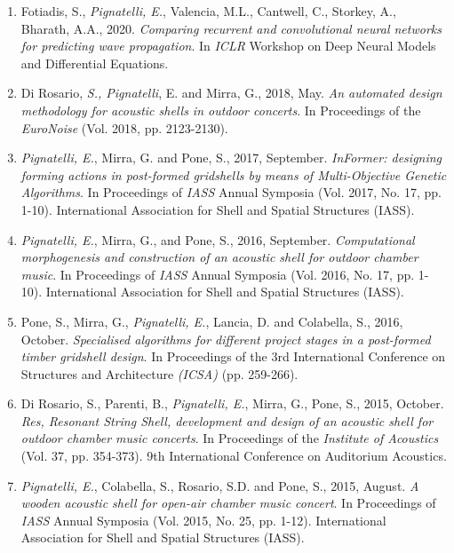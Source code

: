 \begin{publications}
\begin{enumerate}[leftmargin=0.45cm, itemsep=0em, topsep=0.5em, parsep=0.2em]
        \item Fotiadis, S., \emph{Pignatelli, E.}, Valencia, M.L., Cantwell, C., Storkey, A., Bharath, A.A., 2020. \textit{Comparing recurrent and convolutional neural networks for predicting wave propagation}. In \emph{ICLR} Workshop on Deep Neural Models and Differential Equations.
        \item Di Rosario, \emph{S., Pignatelli}, E. and Mirra, G., 2018, May. \textit{An automated design methodology for acoustic shells in outdoor concerts}. In Proceedings of the \emph{EuroNoise} (Vol. 2018, pp. 2123-2130).
        \item \emph{Pignatelli, E.}, Mirra, G. and Pone, S., 2017, September. \textit{InFormer: designing forming actions in post-formed gridshells by means of Multi-Objective Genetic Algorithms}. In Proceedings of \emph{IASS} Annual Symposia (Vol. 2017, No. 17, pp. 1-10). International Association for Shell and Spatial Structures (IASS).
        \item \emph{Pignatelli, E.}, Mirra, G., and Pone, S., 2016, September. \textit{Computational morphogenesis and construction of an acoustic shell for outdoor chamber music}. In Proceedings of \emph{IASS} Annual Symposia (Vol. 2016, No. 17, pp. 1-10). International Association for Shell and Spatial Structures (IASS).
        \item Pone, S., Mirra, G., \emph{Pignatelli, E.}, Lancia, D. and Colabella, S., 2016, October. \textit{Specialised algorithms for different project stages in a post-formed timber gridshell design}. In Proceedings of the 3rd International Conference on Structures and Architecture \emph{(ICSA)} (pp. 259-266).
        \item Di Rosario, S., Parenti, B., \emph{Pignatelli, E.}, Mirra, G., Pone, S., 2015, October. \textit{Res, Resonant String Shell, development and design of an acoustic shell for outdoor chamber music concerts}. In Proceedings of the \emph{Institute of Acoustics} (Vol. 37, pp. 354-373). 9th International Conference on Auditorium Acoustics.
        \item \emph{Pignatelli, E.}, Colabella, S., Rosario, S.D. and Pone, S., 2015, August. \textit{A wooden acoustic shell for open-air chamber music concert}. In Proceedings of \emph{IASS} Annual Symposia (Vol. 2015, No. 25, pp. 1-12). International Association for Shell and Spatial Structures (IASS).
    \end{enumerate}
\end{publications}
